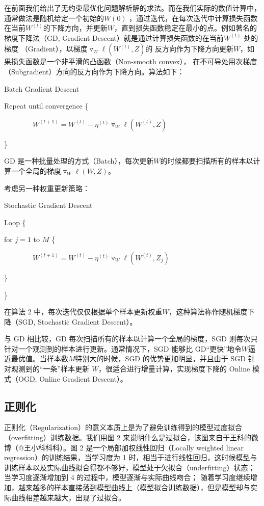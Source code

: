 \documentclass[12pt]{article}
\begin{document}
在前面我们给出了无约束最优化问题解析解的求法。而在我们实际的数值计算中，通常做法是随机给定一个初始的$W(0)$ ，通过迭代，在每次迭代中计算损失函数在当前$W^{(t)}$的下降方向，并更新$W$，直到损失函数稳定在最小的点。例如著名的梯度下降法（GD, Gradient Descent）就是通过计算损失函数的在当前$W^{(t)}$ 处的梯度 （Gradient），以梯度$\triangledown_W\ell(W^{(t)},Z)$的 反方向作为下降方向更新$W$，如果损失函数是一个非平滑的凸函数（Non-smooth convex）， 在不可导处用次梯度（Subgradient）方向的反方向作为下降方向。算法如下：
\begin{algorithm}  
\caption{Batch Gradient Descent}  
Repeat until convergence \{ 

$\qquad \qquad W^{(t+1)} = W^{(t)} - \eta^{(t)} \triangledown_W\ell(W^{(t)}, Z)$

\}
\end{algorithm}  

GD 是一种批量处理的方式（Batch），每次更新$W$的时候都要扫描所有的样本以计算一个全局的梯度$\triangledown_W\ell(W,Z)$。

考虑另一种权重更新策略：
\begin{algorithm}  
\caption{Stochastic Gradient Descent}  
Loop \{

\qquad for $j = 1$ to $M$ \{

$\qquad \qquad W^{(t+1)} = W^{(t)} - \eta^{(t)} \triangledown_W\ell(W^{(t)}, Z_j)$

\qquad \}

\}
\end{algorithm}  

在算法 2 中，每次迭代仅仅根据单个样本更新权重$W$，这种算法称作随机梯度下降（SGD, Stochastic Gradient Descent）。

与 GD 相比较，GD 每次扫描所有的样本以计算一个全局的梯度，SGD 则每次只针对一个观测到的样本进行更新。通常情况下，SGD 能够比 GD“更快”地令$W$逼近最优值。当样本数$M$特别大的时候，SGD 的优势更加明显，并且由于 SGD 针对观测到的“一条”样本更新 $W$，很适合进行增量计算，实现梯度下降的 Online 模式（OGD, Online Gradient Descent）。

\subsection{正则化}
正则化（Regularization）的意义本质上是为了避免训练得到的模型过度拟合（overfitting）训练数据。我们用图 2 来说明什么是过拟合，该图来自于王科的微博（@王小科科科）。图 2 是一个局部加权线性回归（Locally weighted linear regression）的训练结果，当学习度为 1 时，相当于进行线性回归，这时候模型与训练样本以及实际曲线拟合得都不够好，模型处于欠拟合（underfitting）状态；当学习度逐渐增加到 4 的过程中，模型逐渐与实际曲线吻合； 随着学习度继续增加，越来越多的样本直接落到模型曲线上（模型拟合训练数据），但是模型却与实际曲线相差越来越大，出现了过拟合。
\end{document}
